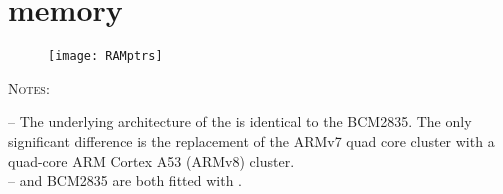 
\chapter{\bcm{} \ram{} memory} %

\label{AppendixB} %

\begin{figure}[!htbp]
\centering
\texttt{[image: RAMptrs]}
\end{figure}

\textsc{Notes}:

-- The underlying architecture of the \bcm{} is identical to the BCM2835. The only significant difference is the replacement of the ARMv7 quad core cluster with a quad-core ARM Cortex A53 (ARMv8) cluster.\\

-- \bcm{} and BCM2835 are both fitted with \vc.

